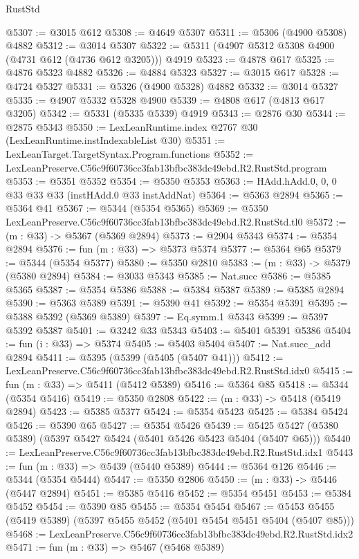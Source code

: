 \begin{lexlean}{RustStd}
\begin{coremodule}
@5307 := @3015 @612
@5308 := @4649 @5307
@5311 := @5306 (@4900 @5308) @4882
@5312 := @3014 @5307
@5322 := @5311 (@4907 @5312 @5308 @4900 (@4731 @612 (@4736 @612 @3205))) @4919
@5323 := @4878 @617
@5325 := @4876 @5323 @4882
@5326 := @4884 @5323
@5327 := @3015 @617
@5328 := @4724 @5327
@5331 := @5326 (@4900 @5328) @4882
@5332 := @3014 @5327
@5335 := @4907 @5332 @5328 @4900
@5339 := @4808 @617 (@4813 @617 @3205)
@5342 := @5331 (@5335 @5339) @4919
@5343 := @2876 @30
@5344 := @2875 @5343
@5350 := LexLeanRuntime.index @2767 @30 (LexLeanRuntime.instIndexableList @30)
@5351 := LexLeanTarget.TargetSyntax.Program.functions
@5352 := LexLeanPreserve.C56c9f60736cc3fab13bfbc383dc49ebd.R2.RustStd.program
@5353 := @5351 @5352
@5354 := @5350 @5353
@5363 := HAdd.hAdd.{0, 0, 0} @33 @33 @33 (instHAdd.{0} @33 instAddNat)
@5364 := @5363 @2894
@5365 := @5364 @41
@5367 := @5344 (@5354 @5365)
@5369 := @5350 LexLeanPreserve.C56c9f60736cc3fab13bfbc383dc49ebd.R2.RustStd.tl0
@5372 := (m : @33) -> @5367 (@5369 @2894)
@5373 := @2904 @5343
@5374 := @5354 @2894
@5376 := fun (m : @33) => @5373 @5374
@5377 := @5364 @65
@5379 := @5344 (@5354 @5377)
@5380 := @5350 @2810
@5383 := (m : @33) -> @5379 (@5380 @2894)
@5384 := @3033 @5343
@5385 := Nat.succ
@5386 := @5385 @5365
@5387 := @5354 @5386
@5388 := @5384 @5387
@5389 := @5385 @2894
@5390 := @5363 @5389
@5391 := @5390 @41
@5392 := @5354 @5391
@5395 := @5388 @5392 (@5369 @5389)
@5397 := Eq.symm.{1} @5343
@5399 := @5397 @5392 @5387
@5401 := @3242 @33 @5343
@5403 := @5401 @5391 @5386
@5404 := fun (i : @33) => @5374
@5405 := @5403 @5404
@5407 := Nat.succ_add @2894
@5411 := @5395 (@5399 (@5405 (@5407 @41)))
@5412 := LexLeanPreserve.C56c9f60736cc3fab13bfbc383dc49ebd.R2.RustStd.idx0
@5415 := fun (m : @33) => @5411 (@5412 @5389)
@5416 := @5364 @85
@5418 := @5344 (@5354 @5416)
@5419 := @5350 @2808
@5422 := (m : @33) -> @5418 (@5419 @2894)
@5423 := @5385 @5377
@5424 := @5354 @5423
@5425 := @5384 @5424
@5426 := @5390 @65
@5427 := @5354 @5426
@5439 := @5425 @5427 (@5380 @5389) (@5397 @5427 @5424 (@5401 @5426 @5423 @5404 (@5407 @65)))
@5440 := LexLeanPreserve.C56c9f60736cc3fab13bfbc383dc49ebd.R2.RustStd.idx1
@5443 := fun (m : @33) => @5439 (@5440 @5389)
@5444 := @5364 @126
@5446 := @5344 (@5354 @5444)
@5447 := @5350 @2806
@5450 := (m : @33) -> @5446 (@5447 @2894)
@5451 := @5385 @5416
@5452 := @5354 @5451
@5453 := @5384 @5452
@5454 := @5390 @85
@5455 := @5354 @5454
@5467 := @5453 @5455 (@5419 @5389) (@5397 @5455 @5452 (@5401 @5454 @5451 @5404 (@5407 @85)))
@5468 := LexLeanPreserve.C56c9f60736cc3fab13bfbc383dc49ebd.R2.RustStd.idx2
@5471 := fun (m : @33) => @5467 (@5468 @5389)

\end{coremodule}
\end{lexlean}
